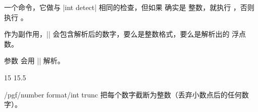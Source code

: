 \documentclass[a4paper,doc2]{ltxdoc}
\begin{document}
\begin{command}{\pgfmathifisint{}}
    一个命令，它做与 |int detect| 相同的检查，但如果  确实是
    整数，就执行 ，否则执行 。

    作为副作用，|\pgfretval| 会包含解析后的数字，要么是整数格式，要么是解析出的
    浮点数。

    参数  会用 |\pgfmathfloatparsenumber| 解析。
\begin{codeexample}[]
15 \hspace{1em}
15.5 
\end{codeexample}
\end{command}

\begin{key}{/pgf/number format/int trunc}
    把每个数字截断为整数（丢弃小数点后的任何数字）。
\begin{codeexample}[]
\hspace{1em}
\hspace{1em}
\hspace{1em}
\hspace{1em}
\end{codeexample}
\end{key}
\end{document}
